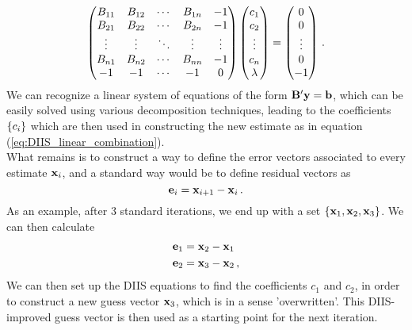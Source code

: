         \begin{equation}
            \begin{pmatrix}
                B_{11}  & B_{12}    & \cdots    & B_{1n}    & -1      \\
                B_{21}  & B_{22}    & \cdots    & B_{2n}    & -1      \\
                \vdots  & \vdots    & \ddots    & \vdots    & \vdots  \\
                B_{n1}  & B_{n2}    & \cdots    & B_{nn}    & -1      \\
                -1      & -1        & \cdots    &  -1       & 0
            \end{pmatrix}
            \begin{pmatrix}
                c_1     \\
                c_2     \\
                \vdots  \\
                c_n     \\
                \lambda
            \end{pmatrix}
            =
            \begin{pmatrix}
                0       \\
                0       \\
                \vdots  \\
                0       \\
                -1
            \end{pmatrix} \thinspace .
        \end{equation}
        We can recognize a linear system of equations of the form $\vb{B}' \vb{y} = \vb{b}$, which can be easily solved using various decomposition techniques, leading to the coefficients $\qty{c_i}$ which are then used in constructing the new estimate as in equation (\ref{eq:DIIS_linear_combination}). \\

        What remains is to construct a way to define the error vectors associated to every estimate $\vb{x}_i$, and a standard way would be to define residual vectors as
        \begin{equation}
            \vb{e}_i = \vb{x}_{i+1} - \vb{x}_i \thinspace .
        \end{equation}
        As an example, after 3 standard iterations, we end up with a set $\qty{\vb{x}_1, \vb{x}_2, \vb{x}_3}$. We can then calculate
        \begin{align}
            &\vb{e}_1 = \vb{x}_2 - \vb{x}_1 \\
            &\vb{e}_2 = \vb{x}_3 - \vb{x}_2 \thinspace ,
        \end{align}
        We can then set up the DIIS equations to find the coefficients $c_1$ and $c_2$, in order to construct a new guess vector $\vb{x}_3$, which is in a sense 'overwritten'. This DIIS-improved guess vector is then used as a starting point for the next iteration.
